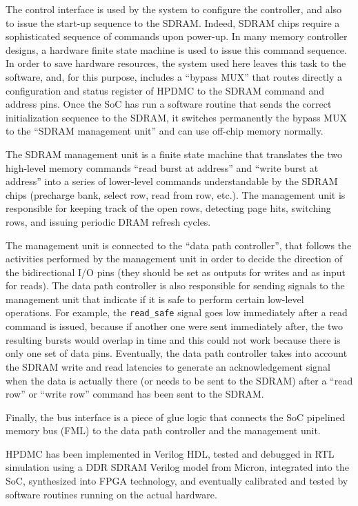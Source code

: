 \documentclass[a4paper,11pt]{kthesis}
\begin{document}
The control interface is used by the system to configure the controller, and also to issue the start-up sequence to the SDRAM. Indeed, SDRAM chips require a sophisticated sequence of commands upon power-up. In many memory controller designs, a hardware finite state machine is used to issue this command sequence. In order to save hardware resources, the system used  here leaves this task to the software, and, for this purpose, includes a ``bypass MUX'' that routes directly a configuration and status register of HPDMC to the SDRAM command and address pins. Once the SoC has run a software routine that sends the correct initialization sequence to the SDRAM, it switches permanently the bypass MUX to the ``SDRAM management unit'' and can use off-chip memory normally.

The SDRAM management unit is a finite state machine that translates the two high-level memory commands ``read burst at address'' and ``write burst at address'' into a series of lower-level commands understandable by the SDRAM chips (precharge bank, select row, read from row, etc.). The management unit is responsible for keeping track of the open rows, detecting page hits, switching rows, and issuing periodic DRAM refresh cycles.

The management unit is connected to the ``data path controller'', that follows the activities performed by the management unit in order to decide the direction of the bidirectional I/O pins (they should be set as outputs for writes and as input for reads). The data path controller is also responsible for sending signals to the management unit that indicate if it is safe to perform certain low-level operations. For example, the \verb!read_safe! signal goes low immediately after a read command is issued, because if another one were sent immediately after, the two resulting bursts would overlap in time and this could not work because there is only one set of data pins. Eventually, the data path controller takes into account the SDRAM write and read latencies to generate an acknowledgement signal when the data is actually there (or needs to be sent to the SDRAM) after a ``read row'' or ``write row'' command has been sent to the SDRAM.

Finally, the bus interface is a piece of glue logic that connects the SoC pipelined memory bus (FML) to the data path controller and the management unit.

HPDMC has been implemented in Verilog HDL, tested and debugged in RTL simulation using a DDR SDRAM Verilog model from Micron, integrated into the SoC, synthesized into FPGA technology, and eventually calibrated and tested by software routines running on the actual hardware.
\end{document}

